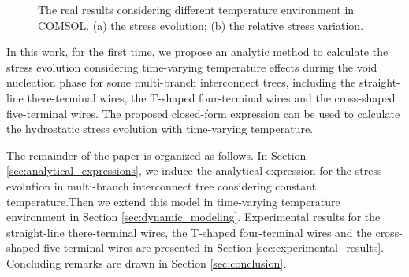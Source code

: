 \begin{figure}[!h]
\centering
{}
\caption{The real results considering different temperature environment in COMSOL. (a) the stress evolution; (b) the relative stress variation.}
\label{fig:NoteTemperature}
\end{figure}

In this work, for the first time, we propose an analytic method to calculate the stress evolution considering time-varying temperature effects during the void nucleation phase for some multi-branch interconnect trees, including the straight-line there-terminal wires, the T-shaped four-terminal wires and the cross-shaped five-terminal wires. The proposed closed-form expression can be used to calculate the hydrostatic stress evolution with time-varying temperature.

The remainder of the paper is organized as follows. In Section \ref{sec:analytical_expressions}, we induce the analytical expression for the stress evolution in multi-branch interconnect tree considering constant temperature.Then we extend this model in time-varying temperature environment in Section \ref{sec:dynamic_modeling}. Experimental results for the straight-line there-terminal wires, the T-shaped four-terminal wires and the cross-shaped five-terminal wires are presented in Section \ref{sec:experimental_results}. Concluding remarks are drawn in Section \ref{sec:conclusion}.



